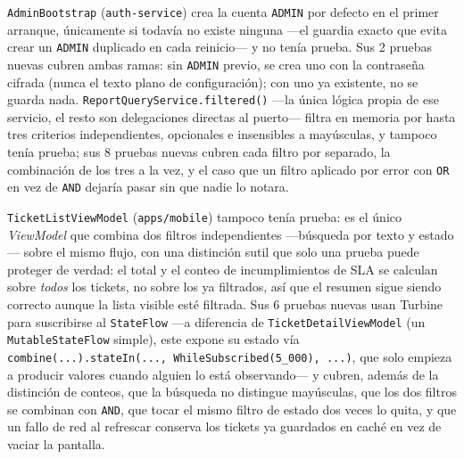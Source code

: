 \texttt{AdminBootstrap} (\texttt{auth-service}) crea la cuenta \texttt{ADMIN} por defecto en el
primer arranque, únicamente si todavía no existe ninguna —el guardia exacto que evita crear un
\texttt{ADMIN} duplicado en cada reinicio— y no tenía prueba. Sus 2 pruebas nuevas cubren ambas
ramas: sin \texttt{ADMIN} previo, se crea uno con la contraseña cifrada (nunca el texto plano de
configuración); con uno ya existente, no se guarda nada. \texttt{ReportQueryService.filtered()}
—la única lógica propia de ese servicio, el resto son delegaciones directas al puerto— filtra en
memoria por hasta tres criterios independientes, opcionales e insensibles a mayúsculas, y tampoco
tenía prueba; sus 8 pruebas nuevas cubren cada filtro por separado, la combinación de los tres a
la vez, y el caso que un filtro aplicado por error con \texttt{OR} en vez de \texttt{AND} dejaría
pasar sin que nadie lo notara.

\texttt{TicketListViewModel} (\texttt{apps/mobile}) tampoco tenía prueba: es el único
\emph{ViewModel} que combina dos filtros independientes —búsqueda por texto y estado— sobre el
mismo flujo, con una distinción sutil que solo una prueba puede proteger de verdad: el total y el
conteo de incumplimientos de SLA se calculan sobre \emph{todos} los tickets, no sobre los ya
filtrados, así que el resumen sigue siendo correcto aunque la lista visible esté filtrada. Sus 6
pruebas nuevas usan Turbine para suscribirse al \texttt{StateFlow} —a diferencia de
\texttt{TicketDetailViewModel} (un \texttt{MutableStateFlow} simple), este expone su estado vía
\texttt{combine(...).stateIn(..., WhileSubscribed(5\_000), ...)}, que solo empieza a producir
valores cuando alguien lo está observando— y cubren, además de la distinción de conteos, que la
búsqueda no distingue mayúsculas, que los dos filtros se combinan con \texttt{AND}, que tocar el
mismo filtro de estado dos veces lo quita, y que un fallo de red al refrescar conserva los
tickets ya guardados en caché en vez de vaciar la pantalla.

